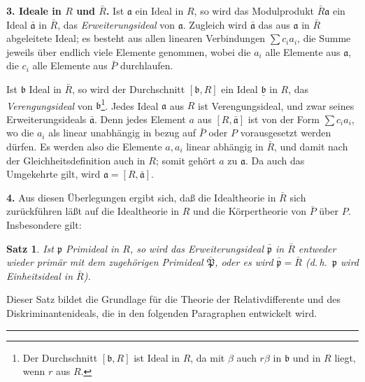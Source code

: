 \documentclass[12pt,a4paper]{article}
\theoremstyle{plain}
\newtheorem{Satz}{Satz}[section]
\theoremstyle{definition}
\theoremstyle{remark}
\begin{document}
\medskip
\noindent
\textbf{3. Ideale in $R$ und $\bar{R}$.} Ist $\mathfrak{a}$ ein Ideal in $R$, so wird das Modulprodukt $\bar{R}\mathfrak{a}$ ein Ideal $\bar{\mathfrak{a}}$ in $\bar{R}$, das \textit{Erweiterungsideal} von $\mathfrak{a}$. Zugleich wird $\bar{\mathfrak{a}}$ das aus $\mathfrak{a}$ in $\bar{R}$ abgeleitete Ideal; es besteht aus allen linearen Verbindungen $\sum c_{i}a_{i}$, die Summe jeweils über endlich viele Elemente genommen, wobei die $a_{i}$ alle Elemente aus $\mathfrak{a}$, die $c_{i}$ alle Elemente aus $\bar{P}$ durchlaufen.

Ist $\mathfrak{b}$ Ideal in $\bar{R}$, so wird der Durchschnitt $[\mathfrak{b}, R]$ ein Ideal $\underline{\mathfrak{b}}$ in $R$, das \textit{Verengungsideal} von $\mathfrak{b}$\footnote{Der Durchschnitt $[\mathfrak{b}, R]$ ist Ideal in $R$, da mit $\beta$ auch $r\beta$ in $\mathfrak{b}$ und in $R$ liegt, wenn $r$ aus $R$.}. Jedes Ideal $\mathfrak{a}$ aus $R$ ist Verengungsideal, und zwar seines Erweiterungsideals $\bar{\mathfrak{a}}$. Denn jedes Element $a$ aus $[R, \bar{\mathfrak{a}}]$ ist von der Form $\sum c_{i}a_{i}$, wo die $a_{i}$ als linear unabhängig in bezug auf $\bar{P}$ oder $P$ vorausgesetzt werden dürfen. Es werden also die Elemente $a, a_{i}$ linear abhängig in $\bar{R}$, und damit nach der Gleichheitsdefinition auch in $R$; somit gehört $a$ zu $\mathfrak{a}$. Da auch das Umgekehrte gilt, wird $\mathfrak{a} = [R, \bar{\mathfrak{a}}]$.

\medskip
\noindent
\textbf{4.} Aus diesen Überlegungen ergibt sich, daß die Idealtheorie in $\bar{R}$ sich zurückführen läßt auf die Idealtheorie in $R$ und die Körpertheorie von $\bar{P}$ über $P$. Insbesondere gilt:

\begin{Satz}
Ist $\mathfrak{p}$ Primideal in $R$, so wird das Erweiterungsideal $\bar{\mathfrak{p}}$ in $\bar{R}$ entweder wieder primär mit dem zugehörigen Primideal $\bar{\mathfrak{P}}$, oder es wird $\bar{\mathfrak{p}} = \bar{R}$ (d.\,h.\ $\mathfrak{p}$ wird Einheitsideal in $\bar{R}$).
\end{Satz}

Dieser Satz bildet die Grundlage für die Theorie der Relativdifferente und des Diskriminantenideals, die in den folgenden Paragraphen entwickelt wird.

\vspace{1cm}
\begin{center}
\rule{0.5\textwidth}{0.4pt}
\end{center}
\end{document}
